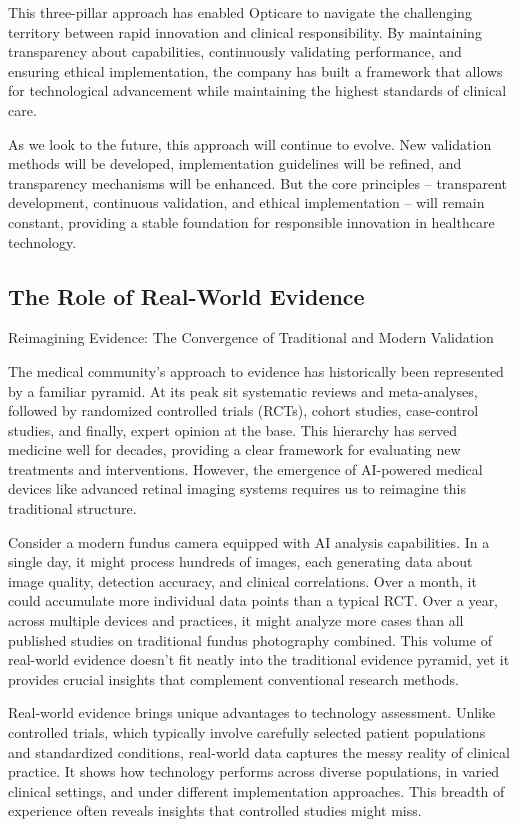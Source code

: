 \documentclass[
  Letterpaper,
]{scrbook}
\begin{document}
This three-pillar approach has enabled Opticare to navigate the
challenging territory between rapid innovation and clinical
responsibility. By maintaining transparency about capabilities,
continuously validating performance, and ensuring ethical
implementation, the company has built a framework that allows for
technological advancement while maintaining the highest standards of
clinical care.

As we look to the future, this approach will continue to evolve. New
validation methods will be developed, implementation guidelines will be
refined, and transparency mechanisms will be enhanced. But the core
principles -- transparent development, continuous validation, and
ethical implementation -- will remain constant, providing a stable
foundation for responsible innovation in healthcare technology.

\subsection{The Role of Real-World
Evidence}\label{the-role-of-real-world-evidence}

Reimagining Evidence: The Convergence of Traditional and Modern
Validation

The medical community's approach to evidence has historically been
represented by a familiar pyramid. At its peak sit systematic reviews
and meta-analyses, followed by randomized controlled trials (RCTs),
cohort studies, case-control studies, and finally, expert opinion at the
base. This hierarchy has served medicine well for decades, providing a
clear framework for evaluating new treatments and interventions.
However, the emergence of AI-powered medical devices like advanced
retinal imaging systems requires us to reimagine this traditional
structure.

Consider a modern fundus camera equipped with AI analysis capabilities.
In a single day, it might process hundreds of images, each generating
data about image quality, detection accuracy, and clinical correlations.
Over a month, it could accumulate more individual data points than a
typical RCT. Over a year, across multiple devices and practices, it
might analyze more cases than all published studies on traditional
fundus photography combined. This volume of real-world evidence doesn't
fit neatly into the traditional evidence pyramid, yet it provides
crucial insights that complement conventional research methods.

Real-world evidence brings unique advantages to technology assessment.
Unlike controlled trials, which typically involve carefully selected
patient populations and standardized conditions, real-world data
captures the messy reality of clinical practice. It shows how technology
performs across diverse populations, in varied clinical settings, and
under different implementation approaches. This breadth of experience
often reveals insights that controlled studies might miss.
\end{document}
